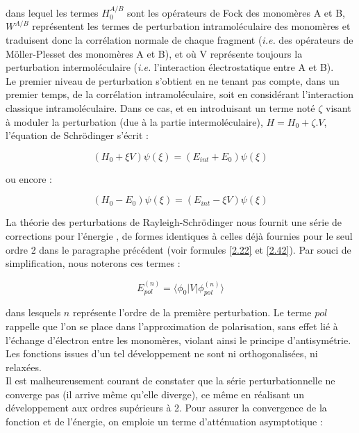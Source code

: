 	\noindent dans lequel les termes $H_{0}^{A/B}$ sont les opérateurs de Fock des monomères A et B, $W^{A/B}$ représentent les termes de perturbation intramoléculaire des monomères et traduisent donc la corrélation \og normale \fg{} de chaque fragment (\textit{i.e.} des opérateurs de Möller-Plesset des monomères A et B), et où V représente toujours la perturbation intermoléculaire (\textit{i.e.} l’interaction électrostatique entre A et B).\\
	
	Le premier niveau de perturbation s’obtient en ne tenant pas compte, dans un premier temps, de la corrélation intramoléculaire, soit en considérant l’interaction classique intramoléculaire. Dans ce cas, et en introduisant un terme noté $\zeta$ visant à moduler la perturbation (due à la partie intermoléculaire), $H = H_0 + \zeta.V$, l’équation de Schr\"{o}dinger s’écrit :
	
	\begin{equation}
	(H_{0} + \xi V) \psi (\xi) = (E_{int} + E_{0}) \psi (\xi)
	\end{equation}
	
	ou encore :
	
	\begin{equation}
	(H_{0} - E_{0}) \psi (\xi) = (E_{int} - \xi V) \psi (\xi)
	\end{equation}
	
	La théorie des perturbations de Rayleigh-Schr\"{o}dinger nous fournit une série de corrections pour l’énergie \cite{chipman1973perturbation}, de formes identiques à celles déjà fournies pour le seul ordre 2 dans le paragraphe précédent (voir formules \ref{2.22} et \ref{2.42}). Par souci de simplification, nous noterons ces termes :
	
	\begin{equation}
	E_{pol}^{(n)} = \langle \phi_{0}|V| \phi_{pol}^{(n)} \rangle
	\end{equation}
	
	\noindent dans lesquels $n$ représente l’ordre de la première perturbation. Le terme \og $pol$ \fg{} rappelle que l'on se place dans l'approximation de polarisation, sans effet lié à l’échange d’électron entre les monomères, violant ainsi le principe d’antisymétrie. Les fonctions issues d’un tel développement ne sont ni orthogonalisées, ni relaxées.\\
	
	Il est malheureusement courant de constater que la série perturbationnelle ne converge pas (il arrive même qu'elle diverge), ce même en réalisant un développement aux ordres supérieurs à 2. Pour assurer la convergence de la fonction et de l’énergie, on emploie un terme d’atténuation asymptotique : 
	
